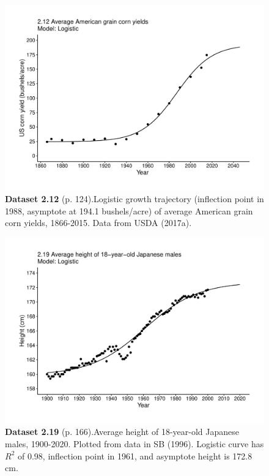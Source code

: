 \documentclass[aps,rmp,preprint,superscriptaddress,10pt,onecolumn]{article}
\begin{document}
\clearpage
\begin{figure}[h]
\includegraphics[width=\textwidth]{output/figs-ggplot/2.12.pdf}
\caption*{\textbf{Dataset 2.12} (p. 124).Logistic growth trajectory (inflection point in 1988, asymptote at 194.1 bushels/acre) of average American grain corn yields, 1866-2015. Data from USDA (2017a).}
\end{figure}
	
\clearpage
\begin{figure}[h]
\includegraphics[width=\textwidth]{output/figs-ggplot/2.19.pdf}
\caption*{\textbf{Dataset 2.19} (p. 166).Average height of 18-year-old Japanese males, 1900-2020. Plotted from data in SB (1996). Logistic curve has $R^2$ of 0.98, inflection point in 1961, and asymptote height is 172.8 cm. }
\end{figure}
	
\end{document}
